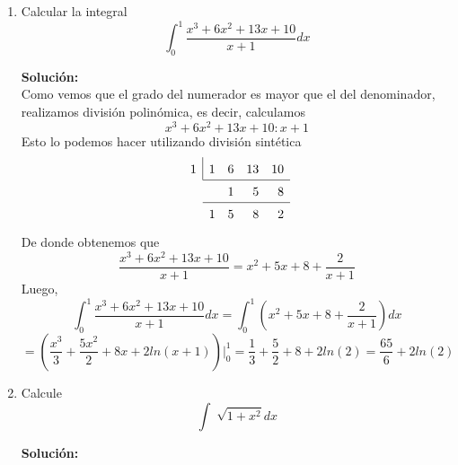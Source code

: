 \documentclass[12pt]{article}
\newenvironment{solucion}
{\begin{mdframed}[backgroundcolor=black!10]
		{\bf Solución:}\\
	}
	{
	\end{mdframed}
}
\newenvironment{preguntas}
{\begin{enumerate}\itemsep12pt
	}
	{
	\end{enumerate}
}
\newcommand{\ev}{\Big|}
\newcommand{\ra}{\rightarrow}
\begin{document}
\begin{preguntas}
\begin{solucion}
		$$\dfrac{1}{x(2-x)} = \dfrac{2A-Ax + Bx}{x(2-x)}$$
		$$\dfrac{1}{x(2-x)} = \dfrac{2A+ (B-A)x}{x(2-x)}$$
		De esta forma, tenemos el siguiente sistema de ecuaciones
		$$2A = 1, \quad B-A = 0 \ra A = \dfrac{1}{2}, \quad B = \dfrac{1}{2}$$
		Entonces, tenemos que la descomposición es
		$$\dfrac{1}{x(2-x)} = \dfrac{1}{2x} + \dfrac{1}{2(2-x)}$$
		Luego, la integral original la podemos escribir como
		$$\displaystyle\int \dfrac{dx}{x(2-x)} = \displaystyle\int \dfrac{dx}{2x} + \displaystyle\int \dfrac{dx}{2(2-x)}$$
		$$ = \dfrac{1}{2} \left( \displaystyle\int \dfrac{dx}{x} + \displaystyle\int \dfrac{dx}{2-x} \right)$$
		$$ = \dfrac{1}{2} (ln|x| - ln|2-x| ) + c$$
\end{solucion}
\item Calcular la integral
	$$\displaystyle\int_0^1 \dfrac{x^3+6x^2+13x+10}{x+1}dx$$
\begin{solucion}
Como vemos que el grado del numerador es mayor que el del denominador, realizamos división polinómica, es decir, calculamos
		$$x^3+6x^2+13x+10 : x+1$$
		Esto lo podemos hacer utilizando división sintética
		$$
		\renewcommand\arraystretch{1.5}
		\setlength\doublerulesep{0pt}
		\begin{array}{rrrrr}
		\multicolumn{1}{r|}{1} & 1 & 6 & 13 & 10\\\cline{2-5}
		& & 1& 5 & 8 \\\cline{2-5}
		& 1 & 5& 8 & 2 
		\end{array}
		$$
		De donde obtenemos que
		$$\dfrac{x^3+6x^2+13x+10}{x+1} = x^2 +5x + 8 + \dfrac{2}{x+1}$$
		Luego,
		$$\displaystyle\int_0^1 \dfrac{x^3+6x^2+13x+10}{x+1}dx = \displaystyle\int_0^1 \left(x^2 + 5x + 8 +  \dfrac{2}{x+1}\right)dx$$
		$$= \left( \dfrac{x^3}{3} + \dfrac{5x^2}{2} + 8x + 2ln(x+1)\right) \ev_0^1 = \dfrac{1}{3} + \dfrac{5}{2} + 8 + 2ln(2) = \dfrac{65}{6} + 2 ln(2)$$
\end{solucion}
\item Calcule
$$\displaystyle\int \sqrt[]{1+x^2}dx$$
\begin{solucion}

\end{solucion}
\end{preguntas}
\end{document}
